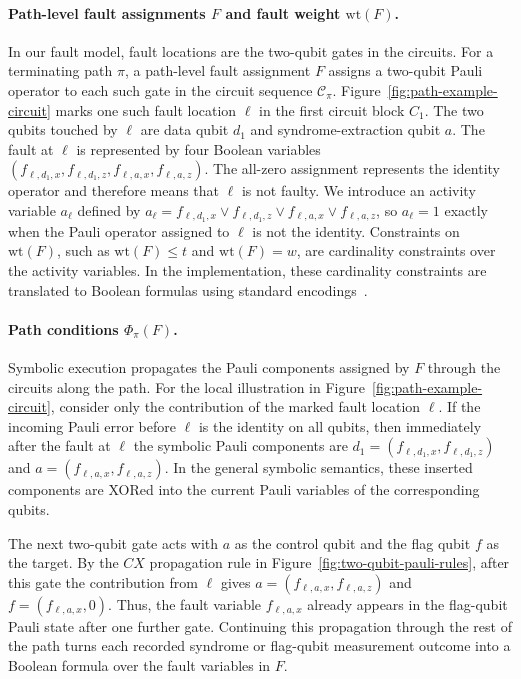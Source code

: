 \documentclass[acmsmall,screen,review,anonymous,nonacm]{acmart}
\begin{document}
\paragraph{Path-level fault assignments $F$ and fault weight $\mathrm{wt}(F)$.}
In our fault model, fault locations are the two-qubit gates in the circuits. For a terminating path $\pi$, a path-level fault assignment $F$ assigns a two-qubit Pauli operator to each such gate in the circuit sequence $\mathcal{C}_\pi$. Figure~\ref{fig:path-example-circuit} marks one such fault location $\ell$ in the first circuit block $C_1$. The two qubits touched by $\ell$ are data qubit $d_1$ and syndrome-extraction qubit $a$. The fault at $\ell$ is represented by four Boolean variables $(f_{\ell,d_1,x},f_{\ell,d_1,z},f_{\ell,a,x},f_{\ell,a,z})$. The all-zero assignment represents the identity operator and therefore means that $\ell$ is not faulty. We introduce an activity variable $a_\ell$ defined by $a_\ell=f_{\ell,d_1,x}\lor f_{\ell,d_1,z}\lor f_{\ell,a,x}\lor f_{\ell,a,z}$, so $a_\ell=1$ exactly when the Pauli operator assigned to $\ell$ is not the identity.  Constraints on $\mathrm{wt}(F)$, such as $\mathrm{wt}(F)\le t$ and $\mathrm{wt}(F)=w$, are cardinality constraints over the activity variables. In the implementation, these cardinality constraints are translated to Boolean formulas using standard encodings~\cite{sinz2005towards}.

\paragraph{Path conditions $\Phi_\pi(F)$.}
Symbolic execution propagates the Pauli components assigned by $F$ through the circuits along the path. For the local illustration in Figure~\ref{fig:path-example-circuit}, consider only the contribution of the marked fault location $\ell$. If the incoming Pauli error before $\ell$ is the identity on all qubits, then immediately after the fault at $\ell$ the symbolic Pauli components are $d_1=(f_{\ell,d_1,x},f_{\ell,d_1,z})$ and $a=(f_{\ell,a,x},f_{\ell,a,z})$. In the general symbolic semantics, these inserted components are XORed into the current Pauli variables of the corresponding qubits.

The next two-qubit gate acts with $a$ as the control qubit and the flag qubit $f$ as the target. By the $CX$ propagation rule in Figure~\ref{fig:two-qubit-pauli-rules}, after this gate the contribution from $\ell$ gives $a=(f_{\ell,a,x},f_{\ell,a,z})$ and $f=(f_{\ell,a,x},0)$. Thus, the fault variable $f_{\ell,a,x}$ already appears in the flag-qubit Pauli state after one further gate. Continuing this propagation through the rest of the path turns each recorded syndrome or flag-qubit measurement outcome into a Boolean formula over the fault variables in $F$.
\end{document}

